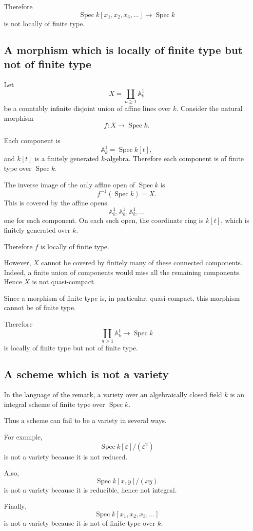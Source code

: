 \documentclass[12pt,a4paper]{article}
\DeclareMathOperator{\Spec}{Spec}
\providecommand{\Spec}{\operatorname{Spec}}
\theoremstyle{notespace}
\begin{document}
Therefore
\[
\Spec k[x_1,x_2,x_3,\dots]\longrightarrow \Spec k
\]
is not locally of finite type.

\subsection*{A morphism which is locally of finite type but not of finite type}

Let
\[
X=\coprod_{n\geq 1}\mathbb A_k^1
\]
be a countably infinite disjoint union of affine lines over \(k\). Consider the natural morphism
\[
f:X\longrightarrow \Spec k.
\]

Each component is
\[
\mathbb A_k^1=\Spec k[t],
\]
and \(k[t]\) is a finitely generated \(k\)-algebra. Therefore each component is of finite type over \(\Spec k\).

The inverse image of the only affine open of \(\Spec k\) is
\[
f^{-1}(\Spec k)=X.
\]
This is covered by the affine opens
\[
\mathbb A_k^1,\mathbb A_k^1,\mathbb A_k^1,\dots
\]
one for each component. On each such open, the coordinate ring is \(k[t]\), which is finitely generated over \(k\).

Therefore \(f\) is locally of finite type.

However, \(X\) cannot be covered by finitely many of these connected components. Indeed, a finite union of components would miss all the remaining components. Hence \(X\) is not quasi-compact.

Since a morphism of finite type is, in particular, quasi-compact, this morphism cannot be of finite type.

Therefore
\[
\coprod_{n\geq 1}\mathbb A_k^1
\longrightarrow
\Spec k
\]
is locally of finite type but not of finite type.

\subsection*{A scheme which is not a variety}

In the language of the remark, a variety over an algebraically closed field \(k\) is an integral scheme of finite type over \(\Spec k\).

Thus a scheme can fail to be a variety in several ways.

For example,
\[
\Spec k[\varepsilon]/(\varepsilon^2)
\]
is not a variety because it is not reduced.

Also,
\[
\Spec k[x,y]/(xy)
\]
is not a variety because it is reducible, hence not integral.

Finally,
\[
\Spec k[x_1,x_2,x_3,\dots]
\]
is not a variety because it is not of finite type over \(k\).
\end{document}
